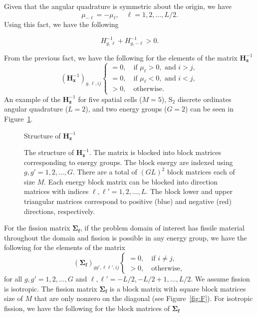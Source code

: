 Given that the angular quadrature is symmetric about the origin, we have
\begin{equation}
	\mu_{-\ell} = -\mu_{\ell}, \quad \ell = 1, 2, \dots, L/2.
\end{equation}
Using this fact, we have the following
\begin{lemma}
\label{lemma:ell}
\begin{equation}
	H_{g,\ell}^{-1} + H_{g,-\ell}^{-1} > 0.
\end{equation}
\end{lemma}
From the previous fact, we have the following for the elements of the matrix $\mathbf{H}_{\mathbf{z}}^{-1}$
\begin{equation}
		(\mathbf{H}_{\mathbf{z}}^{-1})_{g,\ell, ij}
	\begin{cases}
 		= 0, \quad \text{if } \mu_{\ell} > 0, \text{ and } i > j, \\
 		= 0, \quad \text{if } \mu_{\ell} < 0, \text{ and } i < j, \\
		> 0, \quad \text{otherwise.}
	\end{cases}
\end{equation}
An example of the $\mathbf{H}_{\mathbf{z}}^{-1}$ for five spatial cells ($M=5$), S$_{2}$ discrete ordinates angular quadrature ($L=2$), and two energy groups ($G=2$) can be seen in Figure~\ref{fig:iHz}.

\begin{figure}[!htbp]
	\centering
	\resizebox{0.75\textwidth}{!}{}
	\caption{Structure of $\mathbf{H}_{\mathbf{z}}^{-1}$}\label{fig:iHz}
	\caption*{The structure of $\mathbf{H}_{\mathbf{z}}^{-1}$. The matrix is blocked into block matrices corresponding to energy groups. The block energy are indexed using $g, g' = 1, 2, \dots, G$. There are a total of $(GL)^{2}$ block matrices each of size $M$. Each energy block matrix can be blocked into direction matrices with indices $\ell, \ell' = 1, 2, \dots, L$. The block lower and upper triangular matrices correspond to positive (blue) and negative (red) directions, respectively.}
\end{figure}

\clearpage

For the fission matrix $\mathbf{\Sigma_{f}}$, if the problem domain of interest has fissile material throughout the domain and fission is possible in any energy group, we have the following for the elements of the matrix
\begin{equation}
		(\mathbf{\Sigma_{f}})_{gg',\ell \ell', ij}
	\begin{cases}
 		= 0, \quad \text{if } i \neq j, \\
		> 0, \quad \text{otherwise},
	\end{cases}
\end{equation}
for all $g, g' = 1,2,\dots, G$ and $\ell, \ell' = -L/2, -L/2+1, \dots, L/2$. We assume fission is isotropic. The fission matrix $\mathbf{\Sigma_{f}}$ is a block matrix with square block matrices size of $M$ that are only nonzero on the diagonal (see Figure~\ref{fig:F}). For isotropic fission, we have the following for the block matrices of $\mathbf{\Sigma_{f}}$

